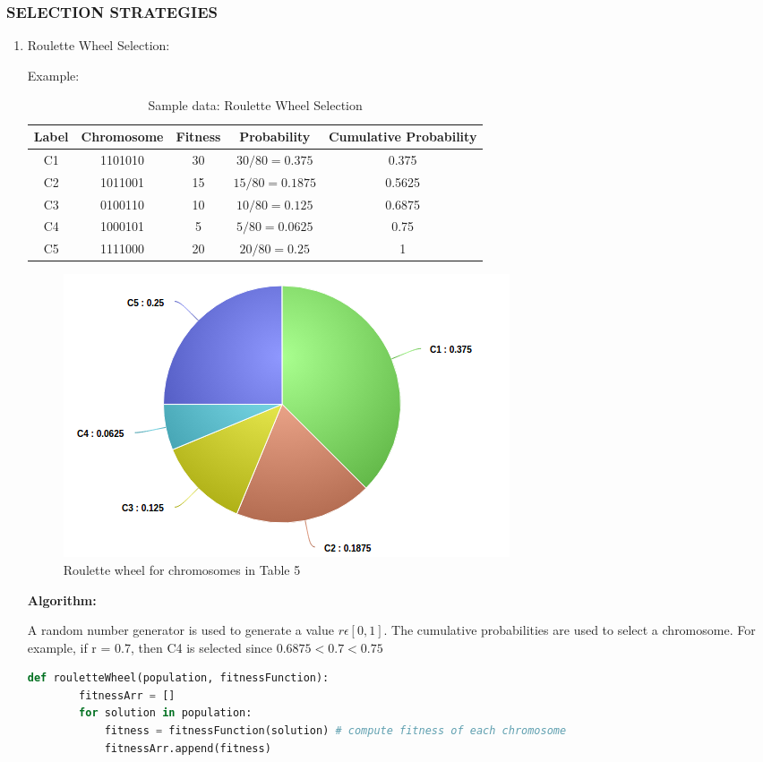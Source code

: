 \documentclass[12pt,a4paper]{article}
\begin{document}
	\subsubsection{SELECTION STRATEGIES}	
	\begin{enumerate}
	\item Roulette Wheel Selection: \par
	Example: \\
	\begin{table}[H]
		\centering
		\caption{Sample data: Roulette Wheel Selection}
		\begin{tabular}{ |c|c|c|c|c| }
		\hline
		Label & Chromosome & Fitness & Probability & Cumulative Probability \\
		\hline
		\hline
		C1 & 1101010 & 30 & $30/80=0.375$ & 0.375 \\
		\hline
		C2 & 1011001 & 15 & $15/80=0.1875$ & 0.5625 \\
		\hline
		C3 & 0100110 & 10 & $10/80=0.125$ & 0.6875 \\
		\hline
		C4 & 1000101 & 5 & $5/80=0.0625$ & 0.75 \\
		\hline
		C5 & 1111000 & 20 & $20/80=0.25$ & 1 \\
		\hline
		\end{tabular}
	\end{table}	
	
	\begin{figure}[h]
		\includegraphics[width=\textwidth]{roulette-pie}
		\caption{Roulette wheel for chromosomes in Table 5}
		\centering
	\end{figure}

	
	\textbf{Algorithm:}\par
	A random number generator is used to generate a value $r \epsilon [0,1]$. The cumulative probabilities are used to select a chromosome. For example, if r = 0.7, then C4 is selected since $0.6875 < 0.7 < 0.75$
	\vspace{5mm}
	\begin{lstlisting}[language=Python]
    def rouletteWheel(population, fitnessFunction):
        fitnessArr = []
        for solution in population:
            fitness = fitnessFunction(solution) # compute fitness of each chromosome
            fitnessArr.append(fitness)
        

\end{lstlisting}
\end{enumerate}
\end{document}
